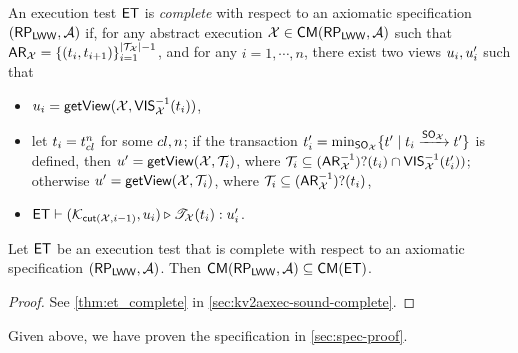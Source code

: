 \begin{definition}
\label{def:main-body-et_complete}
An execution test $\mathsf{ET}$ is \emph{complete} with respect 
to an axiomatic specification $(\mathsf{RP}_{\mathsf{LWW}}, \mathcal{A})$ if, for any 
abstract execution $\mathcal{X} \in \mathsf{CM}(\mathsf{RP}_{\mathsf{LWW}}, \mathcal{A})$ 
such that $\mathsf{AR}_{\mathcal{X}} = \{(t_{i}, t_{i+1})\}_{i=1}^{\lvert \mathcal{T}_{\mathcal{X}} \rvert - 1}$, 
and for any $i=1,\cdots, n$, there exist two views $u_{i}, u_{i}'$ such that 
\begin{itemize}
\item $u_{i} = \mathsf{getView}(\mathcal{X}, \mathsf{VIS}_{\mathcal{X}}^{-1}(t_{i}))$, 
\item let $t_{i} = t_{{cl}}^{n}$ for some ${cl}, n$; if the
transaction $t_{i}' = \min_{\mathsf{SO}_{\mathcal{X}}}\{t' \mid t_i \xrightarrow{\mathsf{SO}_{\mathcal{X}}} t'\}$  
is defined, then $u' = \mathsf{getView}(\mathcal{X}, \mathcal{T}_{i})$, where $\mathcal{T}_{i} \subseteq (\mathsf{AR}_{\mathcal{X}}^{-1})?(t_{i}) \cap \mathsf{VIS}_{\mathcal{X}}^{-1}(t_{i}'))$; 
otherwise $u' = \mathsf{getView}(\mathcal{X}, \mathcal{T}_{i})$, where $\mathcal{T}_{i} \subseteq (\mathsf{AR}_{\mathcal{X}}^{-1})?(t_{i})$, 
\item $\mathsf{ET} \vdash (\mathcal{K}_{\mathsf{cut}(\mathcal{X}, i-1)}, u_{i}) \triangleright \mathscr{T}_{\mathcal{X}}(t_{i}) : u_{i}'$.
\end{itemize}
\end{definition}

\begin{theorem}
\label{thm:main-body-et_complete}
Let $\mathsf{ET}$ be an execution test that is complete with respect to 
an axiomatic specification $(\mathsf{RP}_{\mathsf{LWW}}, \mathcal{A})$. Then 
$\mathsf{CM}(\mathsf{RP}_{\mathsf{LWW}}, \mathcal{A}) \subseteq \mathsf{CM}(\mathsf{ET})$.
\end{theorem}
\begin{proof}
    See \cref{thm:et_complete} in \cref{sec:kv2aexec-sound-complete}.
\end{proof}

Given above, we have proven the specification in \cref{sec:spec-proof}.

